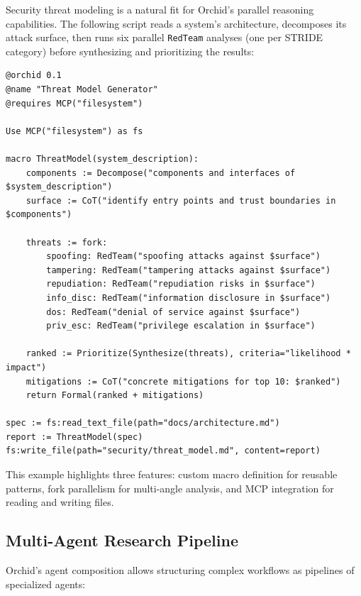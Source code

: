 \documentclass[11pt,a4paper]{article}
\begin{document}
Security threat modeling is a natural fit for Orchid's parallel reasoning capabilities. The following script reads a system's architecture, decomposes its attack surface, then runs six parallel \texttt{RedTeam} analyses (one per STRIDE category) before synthesizing and prioritizing the results:

\begin{lstlisting}[language=orchid]
@orchid 0.1
@name "Threat Model Generator"
@requires MCP("filesystem")

Use MCP("filesystem") as fs

macro ThreatModel(system_description):
    components := Decompose("components and interfaces of $system_description")
    surface := CoT("identify entry points and trust boundaries in $components")

    threats := fork:
        spoofing: RedTeam("spoofing attacks against $surface")
        tampering: RedTeam("tampering attacks against $surface")
        repudiation: RedTeam("repudiation risks in $surface")
        info_disc: RedTeam("information disclosure in $surface")
        dos: RedTeam("denial of service against $surface")
        priv_esc: RedTeam("privilege escalation in $surface")

    ranked := Prioritize(Synthesize(threats), criteria="likelihood * impact")
    mitigations := CoT("concrete mitigations for top 10: $ranked")
    return Formal(ranked + mitigations)

spec := fs:read_text_file(path="docs/architecture.md")
report := ThreatModel(spec)
fs:write_file(path="security/threat_model.md", content=report)
\end{lstlisting}

This example highlights three features: custom macro definition for reusable patterns, fork parallelism for multi-angle analysis, and MCP integration for reading and writing files.

\subsection{Multi-Agent Research Pipeline}

Orchid's agent composition allows structuring complex workflows as pipelines of specialized agents:
\end{document}
